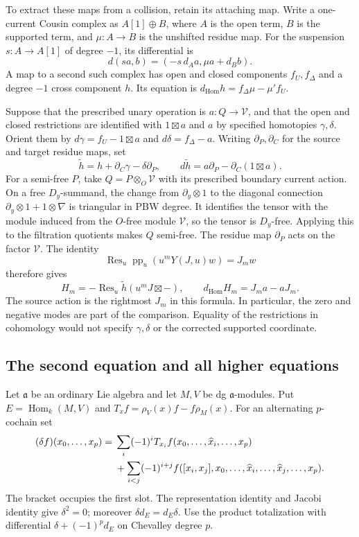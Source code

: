 To extract these maps from a collision, retain its attaching map.
Write a one-current Cousin complex as $A[1]\oplus B$, where $A$ is
the open term, $B$ is the supported term, and $\mu:A\to B$ is the
unshifted residue map. For the suspension $s:A\to A[1]$ of degree
$-1$, its differential is
\[
 d(sa,b)=(-s\,d_Aa,\mu a+d_Bb).
\]
A map to a second such complex has open and closed components
$f_U,f_\Delta$ and a degree $-1$ cross component $h$. Its equation is
$d_{\mathrm{Hom}}h=f_\Delta\mu-\mu'f_U$.

Suppose that the prescribed unary operation is
$a:Q\to\mathcal V$, and that the open and closed restrictions are
identified with $1\boxtimes a$ and $a$ by specified homotopies
$\gamma,\delta$. Orient them by
$d\gamma=f_U-1\boxtimes a$ and $d\delta=f_\Delta-a$.
Writing $\partial_P,\partial_C$ for the source and target residue
maps, set
\begin{equation}\label{eq:vol2-corrected-current-face}
 \widetilde h=h+\partial_C\gamma-\delta\partial_P,
 \qquad
 d\widetilde h=a\partial_P-\partial_C(1\boxtimes a).
\end{equation}
For a semi-free $P$, take $Q=P\otimes_O\mathcal V$ with its
prescribed boundary current action. On a free $D_y$-summand,
the change from $\partial_y\otimes1$ to the diagonal connection
$\partial_y\otimes1+1\otimes\nabla$ is triangular in PBW degree.
It identifies the tensor with the module induced from the
$O$-free module $\mathcal V$, so the tensor is $D_y$-free.
Applying this to the filtration quotients makes $Q$ semi-free.
The residue map $\partial_P$
acts on the factor $\mathcal V$. The identity
\[
 \operatorname{Res}_u\operatorname{pp}_u(u^mY(J,u)w)=J_mw
\]
therefore gives
\begin{equation}\label{eq:vol2-current-first}
 H_m=-\operatorname{Res}_u\widetilde h(u^mJ\boxtimes-),
 \qquad d_{\mathrm{Hom}}H_m=J_ma-aJ_m.
\end{equation}
The source action is the rightmost $J_m$ in this formula. In particular,
the zero and negative modes are part of the comparison. Equality of
the restrictions in cohomology would not specify $\gamma,\delta$ or
the corrected supported coordinate.

\subsection{The second equation and all higher equations}

Let $\mathfrak a$ be an ordinary Lie algebra and let $M,V$ be dg
$\mathfrak a$-modules. Put $E=\operatorname{Hom}_k(M,V)$ and
$T_xf=\rho_V(x)f-f\rho_M(x)$. For an alternating $p$-cochain set
\begin{align}\label{eq:vol2-current-ce}
 (\delta f)(x_0,\ldots,x_p)
 ={}&\sum_i(-1)^iT_{x_i}f(x_0,\ldots,\widehat x_i,\ldots,x_p)
 \notag\\
 &+\sum_{i<j}(-1)^{i+j}
 f([x_i,x_j],x_0,\ldots,\widehat x_i,\ldots,\widehat x_j,\ldots,x_p).
\end{align}
The bracket occupies the first slot. The representation identity and
Jacobi identity give $\delta^2=0$; moreover $\delta d_E=d_E\delta$.
Use the product totalization with differential
$\delta+(-1)^p d_E$ on Chevalley degree $p$.

